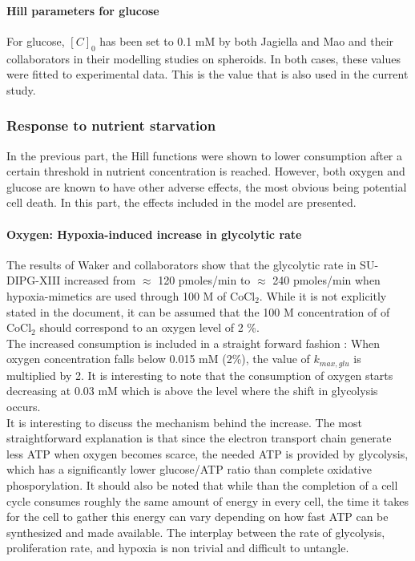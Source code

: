 \documentclass[11pt,a4paper]{article}
\begin{document}
\paragraph{Hill parameters for glucose}For glucose, $[C]_{0}$ has been set to 0.1 mM by both Jagiella and Mao and their collaborators in their modelling studies on spheroids.\cite{Mao2018}\cite{Jagiella2016} In both cases, these values were fitted to experimental data. This is the value that is also used in the current study.
 

\subsubsection{Response to nutrient starvation}
In the previous part, the Hill functions were shown to lower consumption  after a certain threshold in nutrient concentration is reached. However, both oxygen and glucose are known to have other adverse effects, the most obvious being potential cell death. In this part, the effects included in the model are presented.

 
\paragraph{Oxygen: Hypoxia-induced increase in glycolytic rate} 
The results of Waker and collaborators show that the glycolytic rate in SU-DIPG-XIII increased from $\approx$ 120 pmoles/min to $\approx$ 240 pmoles/min when hypoxia-mimetics are used through 100 \textmu M of CoCl$_2$. While it is not explicitly stated in the document, it can be assumed that the 100 \textmu M concentration of of CoCl$_2$ should correspond to an oxygen level of 2 \%.\\ %

The increased consumption is included in a straight forward fashion : When oxygen concentration falls below 0.015 mM (2\%), the value of $k_{max,glu}$ is multiplied by 2. It is interesting to note that the consumption of oxygen starts decreasing at 0.03 mM which is above the level where the shift in glycolysis occurs.\\

It is interesting to discuss the mechanism behind the increase. The most straightforward explanation is that since the electron transport chain generate less ATP when oxygen becomes scarce, the needed ATP is provided by glycolysis, which has a significantly lower glucose/ATP ratio than complete oxidative phosporylation. It should also be noted that while than the completion of a cell cycle consumes roughly the same amount of energy in every cell, the time it takes for the cell to gather this energy can vary depending on how fast ATP can be synthesized and made available. The interplay between the rate of glycolysis, proliferation rate, and hypoxia is non trivial and difficult to untangle. \\
\end{document}
